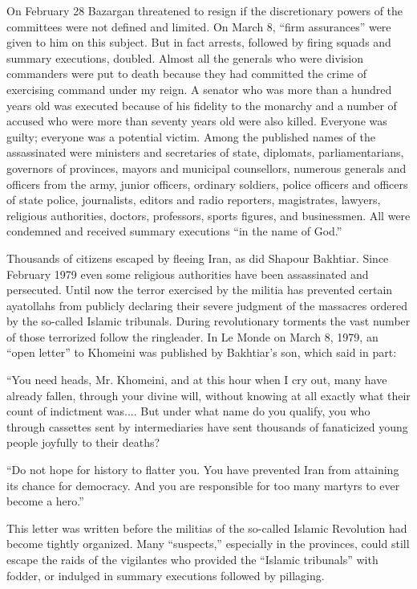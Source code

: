 On February 28 Bazargan threatened to resign if the discretionary powers of the committees were not defined and limited. On March 8, “firm assurances” were given to him on this subject. But in fact arrests, followed by firing squads and summary executions, doubled. Almost all the generals who were division commanders were put to death because they had committed the crime of exercising command under my reign. A senator who was more than a hundred years old was executed because of his fidelity to the monarchy and a number of accused who were more than seventy years old were also killed. Everyone was guilty; everyone was a potential victim. Among the published names of the assassinated were ministers and secretaries of state, diplomats, parliamentarians, governors of provinces, mayors and municipal counsellors, numerous generals and officers from the army, junior officers, ordinary soldiers, police officers and officers of state police, journalists, editors and radio reporters, magistrates, lawyers, religious authorities, doctors, professors, sports figures, and businessmen. All were condemned and received summary executions “in the name of God.” 

Thousands of citizens escaped by fleeing Iran, as did Shapour Bakhtiar. Since February 1979 even some religious authorities have been assassinated and persecuted. Until now the terror exercised by the militia has prevented certain ayatollahs from publicly declaring their severe judgment of the massacres ordered by the so-called Islamic tribunals. During revolutionary torments the vast number of those terrorized follow the ringleader. In Le Monde on March 8, 1979, an “open letter” to Khomeini was published by Bakhtiar’s son, which said in part: 

“You need heads, Mr. Khomeini, and at this hour when I cry out, many have already fallen, through your divine will, without knowing at all exactly what their count of indictment was.... But under what name do you qualify, you who through cassettes sent by intermediaries have sent thousands of fanaticized young people joyfully to their deaths? 

“Do not hope for history to flatter you. You have prevented Iran from attaining its chance for democracy. And you are responsible for too many martyrs to ever become a hero.” 

This letter was written before the militias of the so-called Islamic Revolution had become tightly organized. Many “suspects,” especially in the provinces, could still escape the raids of the vigilantes who provided the “Islamic tribunals” with fodder, or indulged in summary executions followed by pillaging. 

